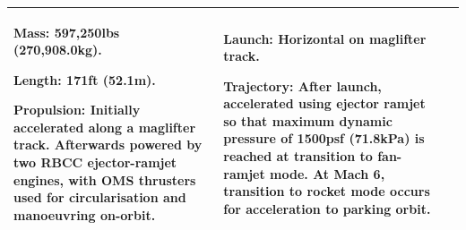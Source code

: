 {\begin{landscape}
\begin{xltabular}{\linewidth}{|X|X|X|}
			\textbf{Mass:} 597,250lbs (270,908.0kg).
			
			\textbf{Length:} 171ft (52.1m). 
			
			\textbf{Propulsion:} Initially accelerated along a maglifter track. Afterwards powered by two RBCC ejector-ramjet engines, with OMS thrusters used for circularisation and manoeuvring on-orbit. 
			
			&\small
			\textbf{Launch:} Horizontal on maglifter track. 
			
			\textbf{Trajectory:} After launch, accelerated using ejector ramjet so that maximum dynamic pressure of 1500psf (71.8kPa) is reached at transition to fan-ramjet mode. 
			At Mach 6, transition to rocket mode occurs for acceleration to parking orbit.\\ 
			
			\hline 
		\end{xltabular} 
		
	\end{landscape}
}

